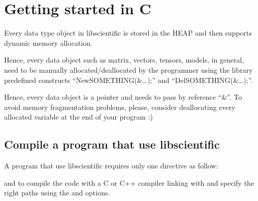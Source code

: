 \documentclass[letterpaper,10pt,english]{sphinxmanual}
\begin{document}
\sphinxstepscope


\chapter{Getting started in C}
\label{\detokenize{GettingStartedInC:getting-started-in-c}}\label{\detokenize{GettingStartedInC::doc}}
\sphinxAtStartPar
Every data type object in libscientific is stored in the HEAP and then supports
dynamic memory allocation.

\sphinxAtStartPar
Hence, every data object such as matrix, vectors, tensors, models, in general,
need to be manually allocated/deallocated by the programmer using the library predefined
constructs “NewSOMETHING(\&…);” and “DelSOMETHING(\&…);”.

\sphinxAtStartPar
Hence, every data object is a pointer and needs to pass by reference “\&”.
To avoid memory fragmentation problems, please, consider deallocating every allocated variable at the end of your program :\sphinxhyphen{})


\section{Compile a program that use libscientific}
\label{\detokenize{GettingStartedInC:compile-a-program-that-use-libscientific}}
\sphinxAtStartPar
A program that use libscientific requires only one directive as follow:

\begin{sphinxVerbatim}[commandchars=\\\{\},numbers=left,firstnumber=1,stepnumber=1]
\end{sphinxVerbatim}

\sphinxAtStartPar
and to compile the code with a C or C++ compiler linking with 
and specify the right paths using the  and 
options.

\begin{sphinxVerbatim}[commandchars=\\\{\},numbers=left,firstnumber=1,stepnumber=1]
\end{sphinxVerbatim}
\end{document}
